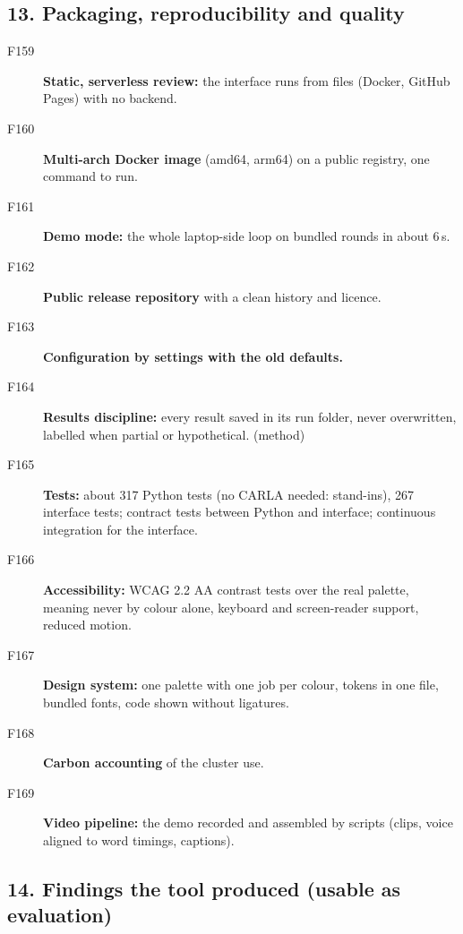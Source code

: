 \subsection*{13. Packaging, reproducibility and quality}

\begin{description}
\item[F159] \textbf{Static, serverless review:} the interface runs from files (Docker, GitHub Pages) with no backend. \taginfra
\item[F160] \textbf{Multi-arch Docker image} (amd64, arm64) on a public registry, one command to run. \taginfra
\item[F161] \textbf{Demo mode:} the whole laptop-side loop on bundled rounds in about 6\,s. \taginfra
\item[F162] \textbf{Public release repository} with a clean history and licence. \taginfra
\item[F163] \textbf{Configuration by settings with the old defaults.} \taginfra
\item[F164] \textbf{Results discipline:} every result saved in its run folder, never overwritten, labelled when partial or hypothetical. \taginfra (method)
\item[F165] \textbf{Tests:} about 317 Python tests (no CARLA needed: stand-ins), 267 interface tests; contract tests between Python and interface; continuous integration for the interface. \taginfra
\item[F166] \textbf{Accessibility:} WCAG 2.2 AA contrast tests over the real palette, meaning never by colour alone, keyboard and screen-reader support, reduced motion. \taginfra
\item[F167] \textbf{Design system:} one palette with one job per colour, tokens in one file, bundled fonts, code shown without ligatures. \taginfra
\item[F168] \textbf{Carbon accounting} of the cluster use. \taginfra {}
\item[F169] \textbf{Video pipeline:} the demo recorded and assembled by scripts (clips, voice aligned to word timings, captions). \taginfra
\end{description}

\subsection*{14. Findings the tool produced (usable as evaluation)}

